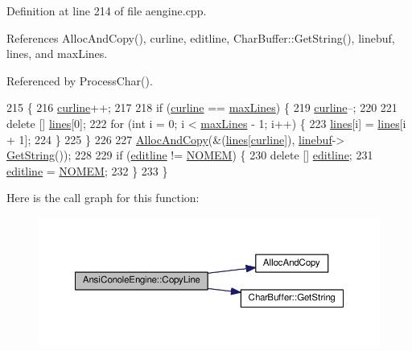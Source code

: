 Definition at line 214 of file aengine.\+cpp.



References Alloc\+And\+Copy(), curline, editline, Char\+Buffer\+::\+Get\+String(), linebuf, lines, and max\+Lines.



Referenced by Process\+Char().


\begin{DoxyCode}
215 \{
216     \hyperlink{classAnsiConoleEngine_ab029fc4a19c5fbd6f6b23c390af618b8}{curline}++;
217 
218     \textcolor{keywordflow}{if} (\hyperlink{classAnsiConoleEngine_ab029fc4a19c5fbd6f6b23c390af618b8}{curline} == \hyperlink{classAnsiConoleEngine_a3f94786b1610ac3f038d5115fd8047a3}{maxLines}) \{
219         \hyperlink{classAnsiConoleEngine_ab029fc4a19c5fbd6f6b23c390af618b8}{curline}--;
220 
221         \textcolor{keyword}{delete} [] \hyperlink{classAnsiConoleEngine_a624ec5321c326a68de340f9b77e84c2c}{lines}[0];
222         \textcolor{keywordflow}{for} (\textcolor{keywordtype}{int} i = 0; i < \hyperlink{classAnsiConoleEngine_a3f94786b1610ac3f038d5115fd8047a3}{maxLines} - 1; i++) \{
223             \hyperlink{classAnsiConoleEngine_a624ec5321c326a68de340f9b77e84c2c}{lines}[i] = \hyperlink{classAnsiConoleEngine_a624ec5321c326a68de340f9b77e84c2c}{lines}[i + 1];
224         \}
225     \}
226 
227     \hyperlink{clib_8h_a5bed05c70cb17e541fee570b5dc32e1a}{AllocAndCopy}(&(\hyperlink{classAnsiConoleEngine_a624ec5321c326a68de340f9b77e84c2c}{lines}[\hyperlink{classAnsiConoleEngine_ab029fc4a19c5fbd6f6b23c390af618b8}{curline}]), \hyperlink{classAnsiConoleEngine_a6bf88afa72a458e3687972f9e666cd86}{linebuf}->
      \hyperlink{classCharBuffer_a7dfd3feaaf80f318ba44efe15b1ec44b}{GetString}());
228 
229     \textcolor{keywordflow}{if} (\hyperlink{classAnsiConoleEngine_a465421c5488f2566d12717641a327017}{editline} != \hyperlink{platform_8h_a46ff2bfbf0d44b8466a2251d5bd5e6f8}{NOMEM}) \{
230         \textcolor{keyword}{delete} [] \hyperlink{classAnsiConoleEngine_a465421c5488f2566d12717641a327017}{editline};
231         \hyperlink{classAnsiConoleEngine_a465421c5488f2566d12717641a327017}{editline} = \hyperlink{platform_8h_a46ff2bfbf0d44b8466a2251d5bd5e6f8}{NOMEM};
232     \}
233 \}
\end{DoxyCode}


Here is the call graph for this function\+:\nopagebreak
\begin{figure}[H]
\begin{center}
\leavevmode
\includegraphics[width=350pt]{classAnsiConoleEngine_ae359fe52bf227c3db6edc42b8fc884f0_cgraph}
\end{center}
\end{figure}




